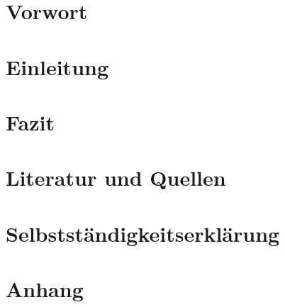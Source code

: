 \documentclass[12pt]{article}
\author{Christoph Derszteler}
\begin{document}
  
  \newpage

  \tableofcontents
  \newpage

  \section{Vorwort}\label{sec:preface}
  \newpage

  \section{Einleitung}\label{sec:introduction}
  \newpage

  \section{Fazit}\label{sec:conclusion}
  \newpage

  \section{Literatur und Quellen}\label{sec:literature-and-sources}
  \newpage

  \section{Selbstständigkeitserklärung}\label{sec:declration-of-independence}
  \newpage

  \section{Anhang}\label{sec:appendix}
  \newpage
\end{document}
